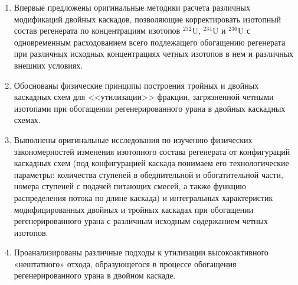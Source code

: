 {\novelty}
\begin{enumerate}
  \item Впервые предложены оригинальные методики расчета различных модификаций двойных каскадов, позволяющие корректировать
  изотопный состав регенерата по концентрациям изотопов $^{232}$U, $^{234}$U и $^{236}$U с одновременным расходованием всего подлежащего обогащению регенерата при различных исходных концентрациях четных изотопов в нем и различных внешних условиях.
  \item Обоснованы физические принципы построения тройных и двойных каскадных схем для <<утилизации>> фракции, загрязненной четными изотопами при обогащении регенерированного урана в двойных каскадных схемах.
  \item Выполнены оригинальные исследования по изучению физических закономерностей изменения изотопного состава регенерата
  от конфигураций каскадных схем (под конфигурацией каскада понимаем его технологические параметры: количества ступеней в обеднительной и обогатительной части, номера ступеней с подачей питающих смесей, а также функцию распределения потока по длине каскада) и интегральных характеристик модифицированных двойных и тройных каскадах при обогащении регенерированного урана с различным исходным содержанием четных изотопов.
  \item Проанализированы различные подходы к утилизации высокоактивного «нештатного» отхода, образующегося в процессе обогащения регенерированного урана в двойном каскаде.

\end{enumerate}

